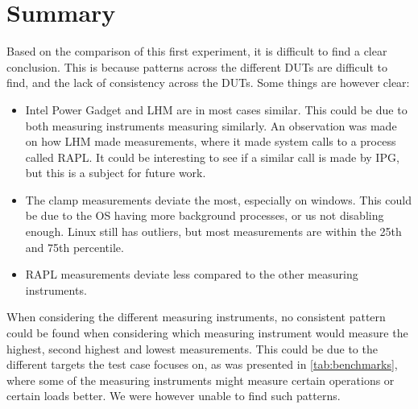 \section{Summary}

Based on the comparison of this first experiment, it is difficult to find a clear conclusion. This is because patterns across the different DUTs are difficult to find, and the lack of consistency across the DUTs. Some things are however clear:

\begin{itemize}
    \item Intel Power Gadget and LHM are in most cases similar. This could be due to both measuring instruments measuring similarly. An observation was made on how LHM made measurements, where it made system calls to a process called RAPL. It could be interesting to see if a similar call is made by IPG, but this is a subject for future work.
    \item The clamp measurements deviate the most, especially on windows. This could be due to the OS having more background processes, or us not disabling enough. Linux still has outliers, but most measurements are within the 25th and 75th percentile.
    \item RAPL measurements deviate less compared to the other measuring instruments.
\end{itemize}

When considering the different measuring instruments, no consistent pattern could be found when considering which measuring instrument would measure the highest, second highest and lowest measurements. This could be due to the different targets the test case focuses on, as was presented in \cref{tab:benchmarks}, where some of the measuring instruments might measure certain operations or certain loads better. We were however unable to find such patterns.

